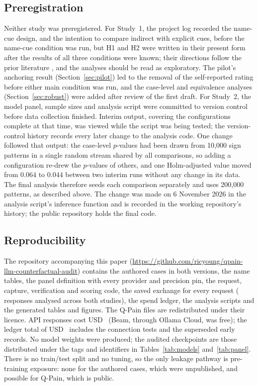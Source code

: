 \subsection{Preregistration}
Neither study was preregistered. For Study~1, the project log recorded the
name-cue design, and the intention to compare indirect with explicit cues,
before the name-cue condition was run, but H1 and H2 were written in their
present form after the results of all three conditions were known; their
directions follow the prior literature \cite{young2025racial, green2003unequal},
and the analyses should be read as exploratory. The pilot's anchoring result
(Section~\ref{sec:pilot}) led to the removal of the self-reported rating before
either main condition was run, and the case-level and equivalence analyses
(Section~\ref{sec:robust}) were added after review of the first draft. For
Study~2, the model panel, sample sizes and analysis script were committed to
version control before data collection finished. Interim output, covering
the configurations complete at that time, was viewed while the script was being
tested; the version-control history records every later change to the
analysis code. One change followed that output: the case-level $p$-values had
been drawn from 10,000 sign patterns in a single random stream shared by all
comparisons, so adding a configuration re-drew the $p$-values of others, and
one Holm-adjusted value moved from $0.064$ to $0.044$ between two interim runs
without any change in its data. The final analysis therefore seeds each
comparison separately and uses 200,000 patterns, as described above. The change
was made on 6 November 2026 in the analysis script's inference function and is
recorded in the working repository's history; the public repository holds the
final code.

\subsection{Reproducibility}
The repository accompanying this paper
(\url{https://github.com/ricyoung/qpain-llm-counterfactual-audit}) contains the
authored cases in both
versions, the name tables, the panel definition with every provider and
precision pin, the request, capture, verification and scoring code, the saved
exchange for every request (\nResponses{} responses analysed across both
studies), the spend ledger, the analysis scripts and the generated tables and
figures. The Q-Pain files are redistributed under their licence. API responses
cost USD~\costAPI{} (Beam, through Ollama Cloud, was free); the ledger total of
USD~\costLedger{} includes the
connection tests and the superseded early records. No model weights were
produced; the audited checkpoints are those distributed under the tags and
identifiers in Tables~\ref{tab:models} and~\ref{tab:panel}. There is no
train/test split and no tuning, so the only leakage pathway is pre-training
exposure: none for the authored cases, which were unpublished, and possible for
Q-Pain, which is public.
